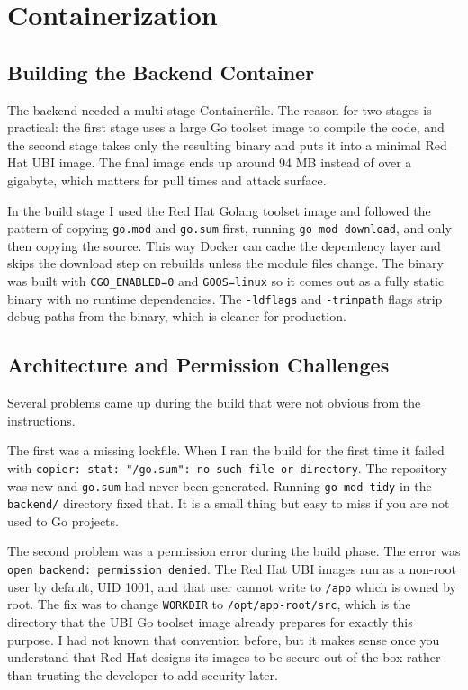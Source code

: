 \section{Containerization}

\subsection{Building the Backend Container}

The backend needed a multi-stage Containerfile. The reason for two stages is practical:
the first stage uses a large Go toolset image to compile the code, and the second stage
takes only the resulting binary and puts it into a minimal Red Hat UBI image. The final
image ends up around 94 MB instead of over a gigabyte, which matters for pull times and
attack surface.

In the build stage I used the Red Hat Golang toolset image and followed the pattern of
copying \texttt{go.mod} and \texttt{go.sum} first, running \texttt{go mod download}, and
only then copying the source. This way Docker can cache the dependency layer and skips
the download step on rebuilds unless the module files change. The binary was built with
\texttt{CGO\_ENABLED=0} and \texttt{GOOS=linux} so it comes out as a fully static
binary with no runtime dependencies. The \texttt{-ldflags} and \texttt{-trimpath} flags
strip debug paths from the binary, which is cleaner for production.

\subsection{Architecture and Permission Challenges}

Several problems came up during the build that were not obvious from the instructions.

The first was a missing lockfile. When I ran the build for the first time it failed with
\texttt{copier: stat: "/go.sum": no such file or directory}. The repository was new and
\texttt{go.sum} had never been generated. Running \texttt{go mod tidy} in the
\texttt{backend/} directory fixed that. It is a small thing but easy to miss if you are
not used to Go projects.

The second problem was a permission error during the build phase. The error was
\texttt{open backend: permission denied}. The Red Hat UBI images run as a non-root user
by default, UID 1001, and that user cannot write to \texttt{/app} which is owned by root.
The fix was to change \texttt{WORKDIR} to \texttt{/opt/app-root/src}, which is the
directory that the UBI Go toolset image already prepares for exactly this purpose. I had
not known that convention before, but it makes sense once you understand that Red Hat
designs its images to be secure out of the box rather than trusting the developer to add
security later.

